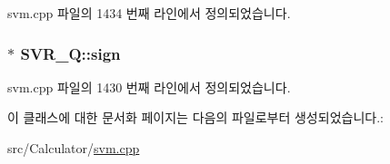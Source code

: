 svm.\+cpp 파일의 1434 번째 라인에서 정의되었습니다.

\hypertarget{class_s_v_r___q_a0255ad0a00ef589c69adc19a06527dfc}{
\subsubsection[{sign}]{$\ast$ S\+V\+R\+\_\+\+Q\+::sign\hspace{0.3cm}{\ttfamily [private]}}}\label{class_s_v_r___q_a0255ad0a00ef589c69adc19a06527dfc}


svm.\+cpp 파일의 1430 번째 라인에서 정의되었습니다.



이 클래스에 대한 문서화 페이지는 다음의 파일로부터 생성되었습니다.\+:\begin{DoxyCompactItemize}
\item 
src/\+Calculator/\hyperlink{svm_8cpp}{svm.\+cpp}\end{DoxyCompactItemize}
